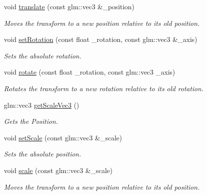 \begin{DoxyCompactItemize}
void \hyperlink{class_cookie_eng_1_1_components_1_1_transform_afe2e00e8126fd92eab8c2e1a5725b2c5}{translate} (const glm\+::vec3 \&\+\_\+position)
\begin{DoxyCompactList}\small\item\em Moves the transform to a new position relative to its old position. \end{DoxyCompactList}\item 
void \hyperlink{class_cookie_eng_1_1_components_1_1_transform_a382a16d437c34d7e345a60d11a9578b2}{set\+Rotation} (const float \+\_\+rotation, const glm\+::vec3 \&\+\_\+axis)
\begin{DoxyCompactList}\small\item\em Sets the absolute rotation. \end{DoxyCompactList}\item 
void \hyperlink{class_cookie_eng_1_1_components_1_1_transform_a061b3b2b5d33c1dda2955e9b2e01d736}{rotate} (const float \+\_\+rotation, const glm\+::vec3 \+\_\+axis)
\begin{DoxyCompactList}\small\item\em Rotates the transform to a new rotation relative to its old rotation. \end{DoxyCompactList}\item 
glm\+::vec3 \hyperlink{class_cookie_eng_1_1_components_1_1_transform_a8ed85d55bd1084dde196ceb1b16fa736}{get\+Scale\+Vec3} ()
\begin{DoxyCompactList}\small\item\em Gets the Position. \end{DoxyCompactList}\item 
void \hyperlink{class_cookie_eng_1_1_components_1_1_transform_a6dadfac773418cc71d538c89219af0db}{set\+Scale} (const glm\+::vec3 \&\+\_\+scale)
\begin{DoxyCompactList}\small\item\em Sets the absolute position. \end{DoxyCompactList}\item 
void \hyperlink{class_cookie_eng_1_1_components_1_1_transform_abfb2568bd0222d8687593d253688f99f}{scale} (const glm\+::vec3 \&\+\_\+scale)
\begin{DoxyCompactList}\small\item\em Moves the transform to a new position relative to its old position. \end{DoxyCompactList}\end{DoxyCompactItemize}
